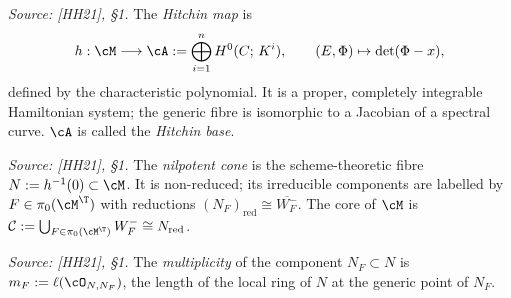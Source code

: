 \begin{definition}
  \label{def:Hitchin_map}
  \textit{Source: [HH21], §1.}
  The \emph{Hitchin map} is
  \[
    h : \cM \longrightarrow \cA := \bigoplus_{i=1}^n H^0(C;\, K^i),
    \qquad (E, \Phi) \mapsto \det(\Phi - x),
  \]
  defined by the characteristic polynomial.  It is a proper, completely integrable Hamiltonian
  system; the generic fibre is isomorphic to a Jacobian of a spectral curve.
  \(\cA\) is called the \emph{Hitchin base}.
\end{definition}

\begin{definition}
  \label{def:nilpotent_cone}
  \textit{Source: [HH21], §1.}
  The \emph{nilpotent cone} is the scheme-theoretic fibre \(N := h^{-1}(0) \subset \cM\).  It is
  non-reduced; its irreducible components are labelled by \(F \in \pi_0(\cM^{\T})\) with
  reductions \((N_F)_\mathrm{red} \cong \overline{W^-_F}\).  The core of \(\cM\) is
  \(\mathcal{C} := \bigcup_{F \in \pi_0(\cM^{\T})} W^-_F \cong N_\mathrm{red}\).
\end{definition}

\begin{definition}
  \label{def:component_multiplicity}
  \textit{Source: [HH21], §1.}
  The \emph{multiplicity} of the component \(N_F \subset N\) is
  \(m_F := \ell(\cO_{N, N_F})\), the length of the local ring of \(N\) at the generic point
  of \(N_F\).
\end{definition}

